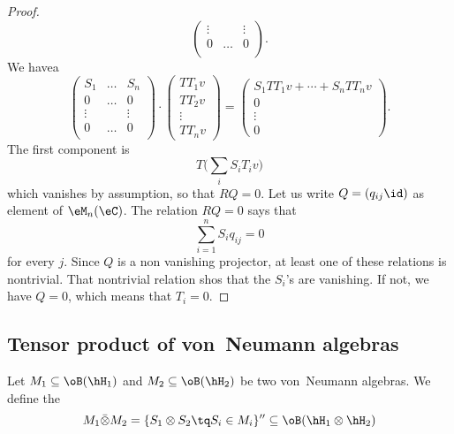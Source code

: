 \begin{proof}
\[\begin{pmatrix}
			\vdots &        & \vdots \\
			0      & \ldots & 0      \\
		\end{pmatrix}.
	\]
	We havea
	\[
		\begin{pmatrix}
			S_1    & \ldots & S_n    \\
			0      & \ldots & 0      \\
			\vdots &        & \vdots \\
			0      & \ldots & 0      \\
		\end{pmatrix}\cdot
		\begin{pmatrix}
			TT_1 v \\
			TT_2 v \\
			\vdots \\
			TT_nv
		\end{pmatrix}
		=
		\begin{pmatrix}
			S_1TT_1v+\cdots+S_nTT_nv \\
			0                        \\
			\vdots                   \\
			0
		\end{pmatrix}.
	\]
	The first component is
	\[
		T\big( \sum_i S_iT_iv \big)
	\]
	which vanishes by assumption, so that $RQ=0$. Let us write $Q=(q_{ij}\id)$ as element of $\eM_n(\eC)$. The relation $RQ=0$ says that
	\begin{equation}
		\sum_{i=1}^n S_iq_{ij}=0
	\end{equation}
	for every $j$. Since $Q$ is a non vanishing projector, at least one of these relations is nontrivial. That nontrivial relation shos that the $S_i$'s are vanishing. If not, we have $Q=0$, which means that $T_i=0$.
\end{proof}

\subsection{Tensor product of von~Neumann algebras}

Let $M_1\subseteq\oB(\hH_1)$ and $M_2\subseteq\oB(\hH_2)$ be two von~Neumann algebras. We define the 
\begin{equation}
	M_1\bar\otimes M_2=\{ S_1\otimes S_2\tq S_i\in M_i \}''\subseteq\oB(\hH_1\otimes\hH_2)
\end{equation}
